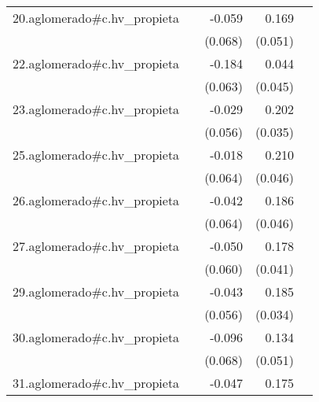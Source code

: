 {\begin{longtable}{l*{4}{D{.}{.}{-1}}}
\addlinespace
20.aglomerado#c.hv\_propieta&                     &      -0.059         &       0.169\sym{**} &                     \\
            &                     &     (0.068)         &     (0.051)         &                     \\
\addlinespace
22.aglomerado#c.hv\_propieta&                     &      -0.184\sym{**} &       0.044         &                     \\
            &                     &     (0.063)         &     (0.045)         &                     \\
\addlinespace
23.aglomerado#c.hv\_propieta&                     &      -0.029         &       0.202\sym{***}&                     \\
            &                     &     (0.056)         &     (0.035)         &                     \\
\addlinespace
25.aglomerado#c.hv\_propieta&                     &      -0.018         &       0.210\sym{***}&                     \\
            &                     &     (0.064)         &     (0.046)         &                     \\
\addlinespace
26.aglomerado#c.hv\_propieta&                     &      -0.042         &       0.186\sym{***}&                     \\
            &                     &     (0.064)         &     (0.046)         &                     \\
\addlinespace
27.aglomerado#c.hv\_propieta&                     &      -0.050         &       0.178\sym{***}&                     \\
            &                     &     (0.060)         &     (0.041)         &                     \\
\addlinespace
29.aglomerado#c.hv\_propieta&                     &      -0.043         &       0.185\sym{***}&                     \\
            &                     &     (0.056)         &     (0.034)         &                     \\
\addlinespace
30.aglomerado#c.hv\_propieta&                     &      -0.096         &       0.134\sym{**} &                     \\
            &                     &     (0.068)         &     (0.051)         &                     \\
\addlinespace
31.aglomerado#c.hv\_propieta&                     &      -0.047         &       0.175\sym{***}&                     \\

\end{longtable}}
